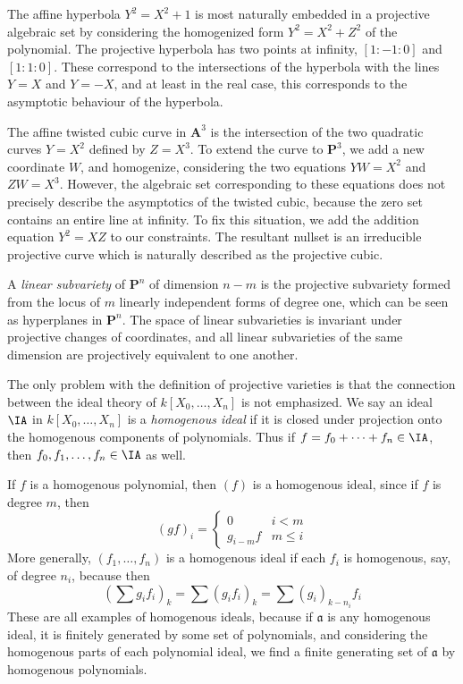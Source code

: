 \begin{example}
    The affine hyperbola $Y^2 = X^2 + 1$ is most naturally embedded in a projective algebraic set by considering the homogenized form $Y^2 = X^2 + Z^2$ of the polynomial. The projective hyperbola has two points at infinity, $[1:-1:0]$ and $[1:1:0]$. These correspond to the intersections of the hyperbola with the lines $Y = X$ and $Y = -X$, and at least in the real case, this corresponds to the asymptotic behaviour of the hyperbola.
\end{example}

\begin{example}
    The affine twisted cubic curve in $\mathbf{A}^3$ is the intersection of the two quadratic curves $Y = X^2$ defined by $Z = X^3$. To extend the curve to $\mathbf{P}^3$, we add a new coordinate $W$, and homogenize, considering the two equations $YW = X^2$ and $ZW = X^3$. However, the algebraic set corresponding to these equations does not precisely describe the asymptotics of the twisted cubic, because the zero set contains an entire line at infinity. To fix this situation, we add the addition equation $Y^2 = XZ$ to our constraints. The resultant nullset is an irreducible projective curve which is naturally described as the projective cubic.
\end{example}

\begin{example}
    A \emph{linear subvariety} of $\mathbf{P}^n$ of dimension $n-m$ is the projective subvariety formed from the locus of $m$ linearly independent forms of degree one, which can be seen as hyperplanes in $\mathbf{P}^n$. The space of linear subvarieties is invariant under projective changes of coordinates, and all linear subvarieties of the same dimension are projectively equivalent to one another.
\end{example}

The only problem with the definition of projective varieties is that the connection between the ideal theory of $k[X_0, \dots, X_n]$ is not emphasized. We say an ideal $\IA$ in $k[X_0, \dots, X_n]$ is a \emph{homogenous ideal} if it is closed under projection onto the homogenous components of polynomials. Thus if $f = f_0 + \dots + f_n \in \IA$, then $f_0, f_1, \dots, f_n \in \IA$ as well.

\begin{example}
    If $f$ is a homogenous polynomial, then $(f)$ is a homogenous ideal, since if $f$ is degree $m$, then
    \[ (gf)_i = \begin{cases} 0 & i < m \\ g_{i-m}f & m \leq i \end{cases} \]
    More generally, $(f_1, \dots, f_n)$ is a homogenous ideal if each $f_i$ is homogenous, say, of degree $n_i$, because then
    \[ \left(\sum g_if_i \right)_k = \sum (g_if_i)_k = \sum (g_i)_{k - n_i} f_i \]
    These are all examples of homogenous ideals, because if $\mathfrak{a}$ is any homogenous ideal, it is finitely generated by some set of polynomials, and considering the homogenous parts of each polynomial ideal, we find a finite generating set of $\mathfrak{a}$ by homogenous polynomials.
\end{example}

